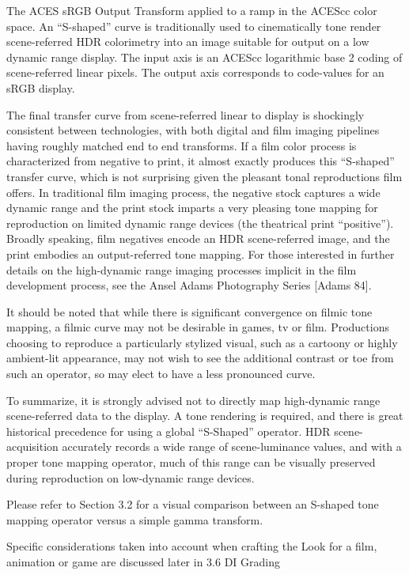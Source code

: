 The ACES sRGB Output Transform applied to a ramp in the ACEScc color space.
An “S-shaped” curve is traditionally used to cinematically tone render scene-referred HDR colorimetry into an image suitable for output on a low dynamic range display. The input axis is an ACEScc logarithmic base 2 coding of scene-referred linear pixels. The output axis corresponds to code-values for an sRGB display.

The final transfer curve from scene-referred linear to display is shockingly consistent between technologies, with both digital and film imaging pipelines having roughly matched end to end transforms. If a film color process is characterized from negative to print, it almost exactly produces this “S-shaped” transfer curve, which is not surprising given the pleasant tonal reproductions film offers. In traditional film imaging process, the negative stock captures a wide dynamic range and the print stock imparts a very pleasing tone mapping for reproduction on limited dynamic range devices (the theatrical print “positive”). Broadly speaking, film negatives encode an HDR scene-referred image, and the print embodies an output-referred tone mapping. For those interested in further details on the high-dynamic range imaging processes implicit in the film development process, see the Ansel Adams Photography Series [Adams 84].

It should be noted that while there is significant convergence on filmic tone mapping, a filmic curve may not be desirable in games, tv or film. Productions choosing to reproduce a particularly stylized visual, such as a cartoony or highly ambient-lit appearance, may not wish to see the additional contrast or toe from such an operator, so may elect to have a less pronounced curve.

To summarize, it is strongly advised not to directly map high-dynamic range scene-referred data to the display. A tone rendering is required, and there is great historical precedence for using a global “S-Shaped” operator. HDR scene-acquisition accurately records a wide range of scene-luminance values, and with a proper tone mapping operator, much of this range can be visually preserved during reproduction on low-dynamic range devices.

Please refer to Section 3.2 for a visual comparison between an S-shaped tone mapping operator versus a simple gamma transform.

Specific considerations taken into account when crafting the Look for a film, animation or game are discussed later in 3.6 DI Grading

